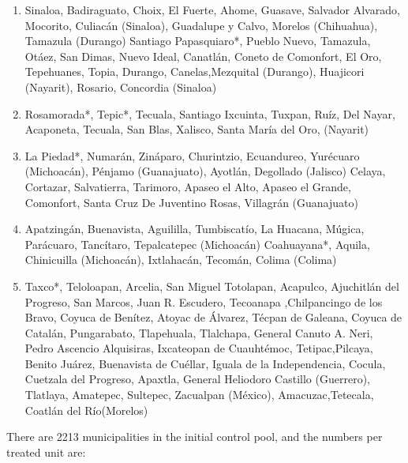 \documentclass{article}[11 pt]
\begin{document}
\begin{enumerate}
\item Sinaloa, Badiraguato, Choix, El Fuerte, Ahome, Guasave, Salvador Alvarado, Mocorito, Culiacán (Sinaloa), Guadalupe y Calvo, Morelos (Chihuahua), Tamazula (Durango) Santiago Papasquiaro*, Pueblo Nuevo, Tamazula, Otáez, San Dimas, Nuevo Ideal, Canatlán, Coneto de Comonfort, El Oro, Tepehuanes, Topia, Durango, Canelas,Mezquital (Durango), Huajicori (Nayarit), Rosario, Concordia (Sinaloa)
\item Rosamorada*, Tepic*, Tecuala, Santiago Ixcuinta, Tuxpan, Ruíz, Del Nayar, Acaponeta, Tecuala, San Blas, Xalisco, Santa María del Oro, (Nayarit)
\item La Piedad*, Numarán, Zináparo, Churintzio, Ecuandureo, Yurécuaro (Michoacán), Pénjamo (Guanajuato), Ayotlán, Degollado  (Jalisco)
Celaya, Cortazar, Salvatierra, Tarimoro, Apaseo el Alto, Apaseo el Grande, Comonfort, Santa Cruz De Juventino Rosas, Villagrán (Guanajuato)
\item Apatzingán, Buenavista, Aguililla, Tumbiscatío, La Huacana, Múgica, Parácuaro, Tancítaro, Tepalcatepec (Michoacán)
Coahuayana*, Aquila, Chinicuilla (Michoacán), Ixtlahacán, Tecomán, Colima (Colima)
\item Taxco*, Teloloapan, Arcelia, San Miguel Totolapan, Acapulco, Ajuchitlán del Progreso, San Marcos, Juan R. Escudero, Tecoanapa ,Chilpancingo de los Bravo, Coyuca de Benítez, Atoyac de Álvarez, Técpan de Galeana, Coyuca de Catalán, Pungarabato, Tlapehuala, Tlalchapa, General Canuto A. Neri, Pedro Ascencio Alquisiras, Ixcateopan de Cuauhtémoc, Tetipac,Pilcaya, Benito Juárez, Buenavista de Cuéllar, Iguala de la Independencia, Cocula, Cuetzala del Progreso, Apaxtla, General Heliodoro Castillo  (Guerrero), Tlatlaya, Amatepec, Sultepec,  Zacualpan (México), Amacuzac,Tetecala, Coatlán del Río(Morelos)

\end{enumerate}	

There are 2213 municipalities in the initial control pool, and the numbers per treated unit are:
% 
\end{document}
